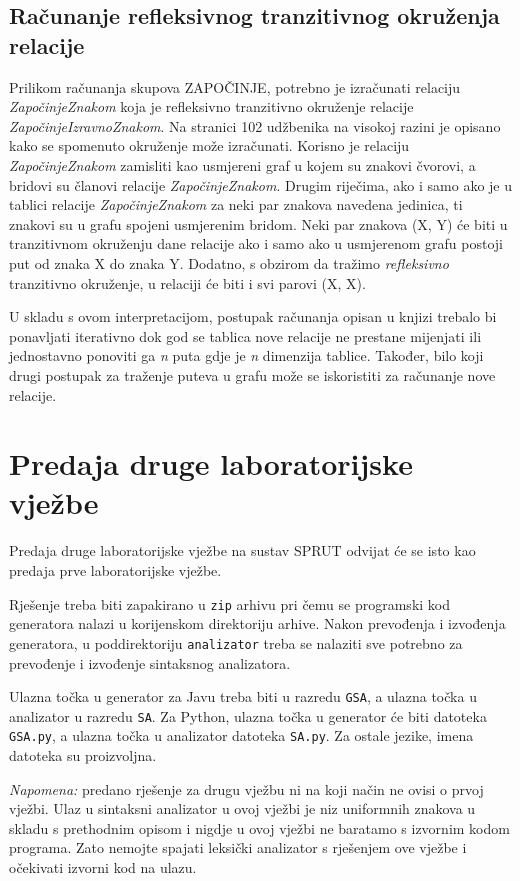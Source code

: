 \documentclass[times, 12pt, utf8]{book}
\begin{document}
\subsection{Računanje refleksivnog tranzitivnog okruženja relacije}
Prilikom računanja skupova ZAPOČINJE, potrebno je izračunati relaciju {\em ZapočinjeZnakom} koja je refleksivno tranzitivno okruženje relacije {\em ZapočinjeIzravnoZnakom}.
Na stranici 102 udžbenika na visokoj razini je opisano kako se spomenuto okruženje može izračunati.
Korisno je relaciju {\em ZapočinjeZnakom} zamisliti kao usmjereni graf u kojem su znakovi čvorovi, a bridovi su članovi relacije {\em ZapočinjeZnakom}.
Drugim riječima, ako i samo ako je u tablici relacije {\em ZapočinjeZnakom} za neki par znakova navedena jedinica, ti znakovi su u grafu spojeni usmjerenim bridom.
Neki par znakova (X, Y) će biti u tranzitivnom okruženju dane relacije ako i samo ako u usmjerenom grafu postoji put od znaka X do znaka Y.
Dodatno, s obzirom da tražimo {\em refleksivno} tranzitivno okruženje, u relaciji će biti i svi parovi (X, X).

U skladu s ovom interpretacijom, postupak računanja opisan u knjizi trebalo bi ponavljati iterativno dok god se tablica nove relacije ne prestane mijenjati ili jednostavno ponoviti ga {\em n} puta gdje je {\em n} dimenzija tablice.
Također, bilo koji drugi postupak za traženje puteva u grafu može se iskoristiti za računanje nove relacije.

\section{Predaja druge laboratorijske vježbe}
Predaja druge laboratorijske vježbe na sustav SPRUT odvijat će se isto kao predaja prve laboratorijske vježbe.

Rješenje treba biti zapakirano u \texttt{zip} arhivu pri čemu se programski kod generatora nalazi u korijenskom direktoriju arhive.
Nakon prevođenja i izvođenja generatora, u poddirektoriju \texttt{analizator} treba se nalaziti sve potrebno za prevođenje i izvođenje sintaksnog analizatora.

Ulazna točka u generator za Javu treba biti u razredu \texttt{GSA}, a ulazna točka u analizator u razredu \texttt{SA}.
Za Python, ulazna točka u generator će biti datoteka \texttt{GSA.py}, a ulazna točka u analizator datoteka \texttt{SA.py}.
Za ostale jezike, imena datoteka su proizvoljna.

\emph{Napomena:} predano rješenje za drugu vježbu ni na koji način ne ovisi o prvoj vježbi. Ulaz u sintaksni analizator u ovoj vježbi je niz uniformnih znakova u skladu s prethodnim opisom i nigdje u ovoj vježbi ne baratamo s izvornim kodom programa. Zato nemojte spajati leksički analizator s rješenjem ove vježbe i očekivati izvorni kod na ulazu.
\end{document}
